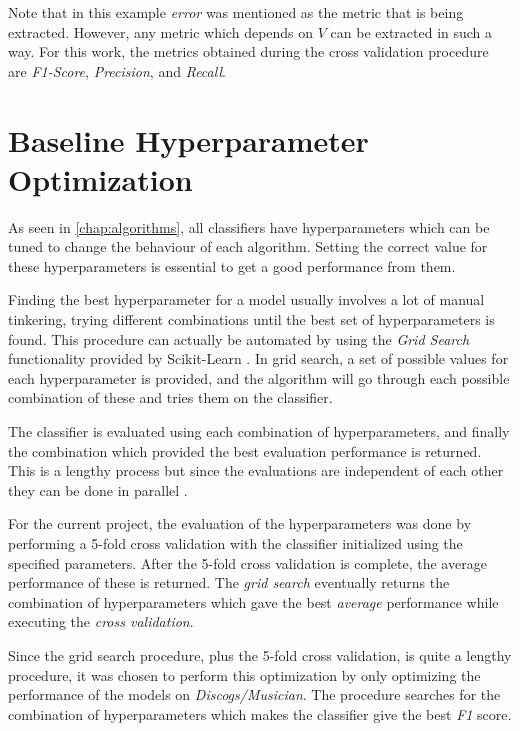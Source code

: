 \documentclass[epsfig,a4paper,11pt,titlepage,twoside,openany]{book}
\begin{document}
Note that in this example \textit{error} was mentioned as the metric that is being extracted. However, any metric which depends on $V$ can be extracted in such a way. For this work, the metrics obtained during the cross validation procedure are \textit{F1-Score}, \textit{Precision}, and \textit{Recall}.


\section{Baseline Hyperparameter Optimization}
\label{sec:hyperpar-optimization}

As seen in \autoref{chap:algorithms}, all classifiers have hyperparameters which can be tuned to change the behaviour of each algorithm. Setting the correct value for these hyperparameters is essential to get a good performance from them. 

Finding the best hyperparameter for a model usually involves a lot of manual tinkering, trying different combinations until the best set of hyperparameters is found. This procedure can actually be automated by using the \textit{Grid Search} \cite{claesen2015hyperparameter} functionality provided by Scikit-Learn \cite{scikit-learn}. In grid search, a set of possible values for each hyperparameter is provided, and the algorithm will go through each possible combination of these and tries them on the classifier. 

The classifier is evaluated using each combination of hyperparameters, and finally the combination which provided the best evaluation performance is returned. This is a lengthy process but since the evaluations are independent of each other they can be done in parallel \cite{Bergstra:2012_random_gs}.

For the current project, the evaluation of the hyperparameters was done by performing a 5-fold cross validation with the classifier initialized using the specified parameters. After the 5-fold cross validation is complete, the average performance of these is returned. The \textit{grid search} eventually returns the combination of hyperparameters which gave the best \textit{average} performance while executing the \textit{cross validation}.

Since the grid search procedure, plus the 5-fold cross validation, is quite a lengthy procedure, it was chosen to perform this optimization by only optimizing the performance of the models on \textit{Discogs/Musician}. The procedure searches for the combination of hyperparameters which makes the classifier give the best \textit{F1} score.
\end{document}
